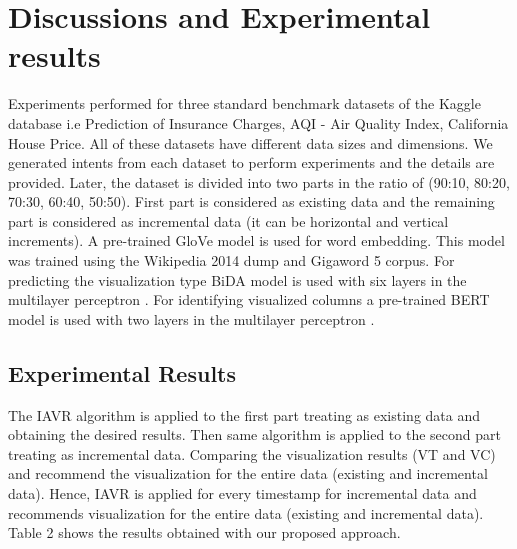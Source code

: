 \section{Discussions and Experimental results}
Experiments performed for three standard benchmark datasets of the Kaggle database i.e Prediction of Insurance Charges, AQI - Air Quality Index, California House Price. All of these datasets have different data sizes and dimensions.
We generated intents from each dataset to perform experiments and the details are provided. Later, the dataset is divided into two parts in the ratio of (90:10, 80:20, 70:30, 60:40, 50:50). First part is considered as existing data and the remaining part is considered as incremental data (it can be horizontal and vertical increments).
A pre-trained GloVe model \cite{pennington2014glove} is used for word embedding. This model was trained using the Wikipedia 2014 dump and Gigaword 5 corpus. For predicting the visualization type BiDA model is used with six layers in the multilayer perceptron \cite{maruta2021intent}. For identifying visualized columns a pre-trained BERT model is used with two layers in the multilayer perceptron \cite{maruta2021intent}. 
\subsection{Experimental Results} 
The IAVR \cite{maruta2021intent} algorithm is applied to the first part treating as existing data and obtaining the desired results. Then same algorithm is applied to the second part treating as incremental data. Comparing the visualization results (VT and VC) and recommend the visualization for the entire data (existing and incremental data). Hence, IAVR \cite{maruta2021intent} is applied for every timestamp for incremental data and recommends visualization for the entire data (existing and incremental data). 
Table 2 shows the results obtained with our proposed approach.



